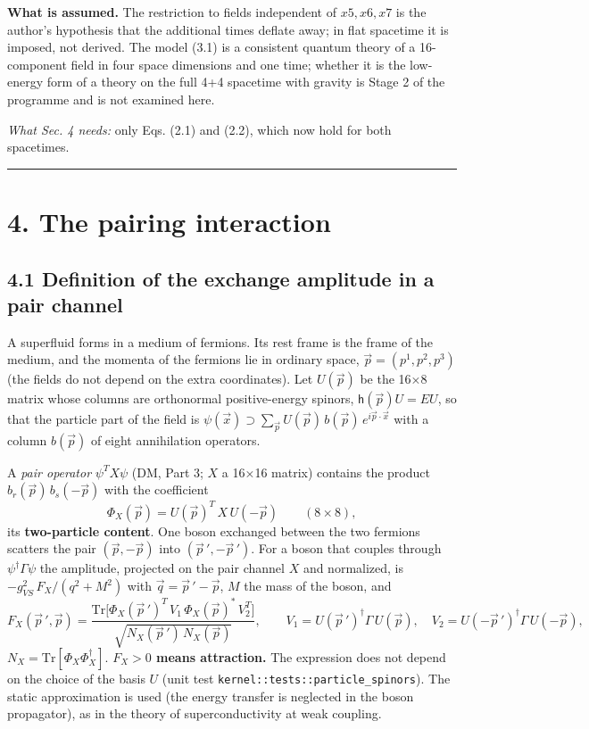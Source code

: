 \documentclass[
  10pt,
]{article}
\begin{document}
\textbf{What is assumed.} The restriction to fields independent of
\(x5,x6,x7\) is the author's hypothesis that the additional times
deflate away; in flat spacetime it is imposed, not derived. The model
(3.1) is a consistent quantum theory of a 16-component field in four
space dimensions and one time; whether it is the low-energy form of a
theory on the full 4+4 spacetime with gravity is Stage 2 of the
programme and is not examined here.

\emph{What Sec. 4 needs:} only Eqs. (2.1) and (2.2), which now hold for
both spacetimes.

\begin{center}\rule{0.5\linewidth}{0.5pt}\end{center}

\hypertarget{the-pairing-interaction}{%
\section{4. The pairing interaction}\label{the-pairing-interaction}}

\hypertarget{definition-of-the-exchange-amplitude-in-a-pair-channel}{%
\subsection{4.1 Definition of the exchange amplitude in a pair
channel}\label{definition-of-the-exchange-amplitude-in-a-pair-channel}}

A superfluid forms in a medium of fermions. Its rest frame is the frame
of the medium, and the momenta of the fermions lie in ordinary space,
\(\vec p=(p^1,p^2,p^3)\) (the fields do not depend on the extra
coordinates). Let \(U(\vec p)\) be the 16×8 matrix whose columns are
orthonormal positive-energy spinors, \(\mathsf h(\vec p)U=EU\), so that
the particle part of the field is
\(\psi(\vec x)\supset\sum_{\vec p}U(\vec p)\,b(\vec p)\,e^{i\vec p\cdot\vec x}\)
with a column \(b(\vec p)\) of eight annihilation operators.

A \emph{pair operator} \(\psi^TX\psi\) (DM, Part 3; \(X\) a 16×16
matrix) contains the product \(b_r(\vec p)\,b_s(-\vec p)\) with the
coefficient
\[\Phi_X(\vec p)=U(\vec p)^T\,X\,U(-\vec p)\qquad(8\times8),\tag{4.1}\]
its \textbf{two-particle content}. One boson exchanged between the two
fermions scatters the pair \((\vec p,-\vec p)\) into
\((\vec p\,',-\vec p\,')\). For a boson that couples through
\(\psi^\dagger\Gamma\psi\) the amplitude, projected on the pair channel
\(X\) and normalized, is \(-g_{VS}^2\,F_X/(q^2+M^2)\) with
\(\vec q=\vec p\,'-\vec p\), \(M\) the mass of the boson, and
\[F_X(\vec p\,',\vec p)=\frac{\mathrm{Tr}\big[\Phi_X(\vec p\,')^{T}\,V_1\,\Phi_X(\vec p)^{*}\,V_2^{T}\big]}{\sqrt{N_X(\vec p\,')\,N_X(\vec p)}},\qquad
V_1=U(\vec p\,')^\dagger\Gamma\,U(\vec p),\quad V_2=U(-\vec p\,')^\dagger\Gamma\,U(-\vec p),\tag{4.2}\]
\(N_X=\mathrm{Tr}[\Phi_X\Phi_X^\dagger]\). \textbf{\(F_X>0\) means
attraction.} The expression does not depend on the choice of the basis
\(U\) (unit test \texttt{kernel::tests::particle\_spinors}). The static
approximation is used (the energy transfer is neglected in the boson
propagator), as in the theory of superconductivity at weak coupling.
\end{document}
